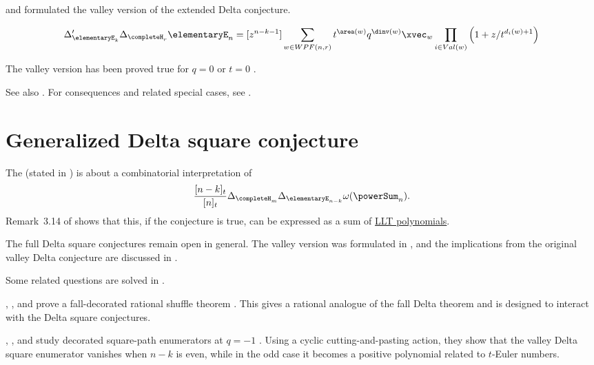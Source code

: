  and  \cite{QiuWilson2020} formulated the
valley version of the extended Delta conjecture.
\begin{conjecture}
\[
\Delta'_{\elementaryE_k} \Delta_{\completeH_r} \elementaryE_n
=
[z^{n-k-1}]
\sum_{w \in WPF(n,r)} t^{\area(w)}q^{\dinv(w)} \xvec_w
\prod_{i \in Val(w)} \left(1 + z/t^{d_i(w)+1}\right)
\]
\end{conjecture}
The valley version has been proved true for $q=0$ or $t=0$
\cite{QiuWilson2020}.

See also \cite{Bergeron2024}.
For consequences and related special cases, see \cite{DAdderioIraci2023}.


\section[dhDeltaSquare]{Generalized Delta square conjecture}

The 
\label{generalizedDeltaSquareConjecture} (stated in
\cite{DAdderioIraciWyngaerd2019})
is about a combinatorial interpretation of
\[
  \frac{[n-k]_t}{[n]_t} \Delta_{\completeH_m} \Delta_{\elementaryE_{n-k}} \omega(\powerSum_n).
\]
Remark~3.14 of \cite{DAdderioIraciWyngaerd2019} shows that this, if the
conjecture is true, can be expressed as a sum of \hyperref[LLT]{LLT polynomials}.

The full Delta square conjectures remain open in general.  The valley version
was formulated in \cite{IraciWyngaerd2021}, and the implications from the
original valley Delta conjecture are discussed in \cite{IraciWyngaerd2022}.

Some related questions are solved in \cite{Romero2022}.

, , and 
prove a fall-decorated rational shuffle theorem
\cite{IraciPagariaPaolini2025x}.  This gives a rational analogue of the
fall Delta theorem and is designed to interact with the Delta square
conjectures.

, , and
 study decorated square-path enumerators at
$q=-1$ \cite{CorteelLazarWyngaerd2024x}.  Using a cyclic cutting-and-pasting
action, they show that the valley Delta square enumerator vanishes when
$n-k$ is even, while in the odd case it becomes a positive polynomial related
to $t$-Euler numbers.

